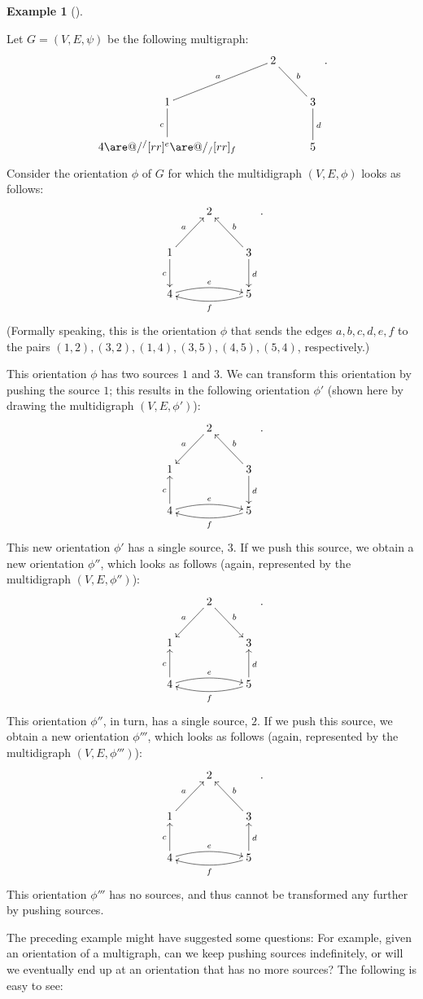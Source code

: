\documentclass[numbers=enddot,12pt,final,onecolumn,notitlepage]{scrartcl}%
\makeatletter
\theoremstyle{definition}
\newtheorem{exam}[theo]{Example}
\newenvironment{example}[1][]
{\begin{exam}[#1]\begin{leftbar}}
{\end{leftbar}\end{exam}}
\newcommand{\tup}[1]{\left( #1 \right)}
\newcommand{\are}{\ar@{-}}
\makeatother
\begin{document}
\Needspace{25cm}
\begin{example}
Let $G = \tup{V, E, \psi}$ be the following multigraph:
\[
\xymatrix{
& 2 \are[dl]_a \are[dr]^b \\
1 \are[d]_c & & 3 \are[d]^d \\
4 \are@/^/[rr]^e \are@/_/[rr]_f & & 5
} .
\]
Consider the orientation $\phi$ of $G$ for which the
multidigraph $\tup{V, E, \phi}$ looks as follows:
\[
\xymatrix{
& 2 \ar@{<-}[dl]_a \ar@{<-}[dr]^b \\
1 \ar[d]_c & & 3 \ar[d]^d \\
4 \ar@/^/[rr]^e \ar@{<-}@/_/[rr]_f & & 5
} .
\]
(Formally speaking, this is the orientation $\phi$ that
sends the edges $a, b, c, d, e, f$ to the pairs
$\tup{1, 2}, \tup{3, 2}, \tup{1, 4}, \tup{3, 5}, \tup{4, 5},
\tup{5, 4}$, respectively.)

This orientation $\phi$ has two sources $1$ and $3$.
We can transform this orientation by pushing the source
$1$; this results in the following orientation $\phi'$
(shown here by drawing the multidigraph $\tup{V, E, \phi'}$):
\[
\xymatrix{
& 2 \ar[dl]_a \ar@{<-}[dr]^b \\
1 \ar@{<-}[d]_c & & 3 \ar[d]^d \\
4 \ar@/^/[rr]^e \ar@{<-}@/_/[rr]_f & & 5
} .
\]
This new orientation $\phi'$ has a single source, $3$.
If we push this source, we obtain a new orientation
$\phi''$, which looks as follows (again, represented
by the multidigraph $\tup{V, E, \phi''}$):
\[
\xymatrix{
& 2 \ar[dl]_a \ar[dr]^b \\
1 \ar@{<-}[d]_c & & 3 \ar@{<-}[d]^d \\
4 \ar@/^/[rr]^e \ar@{<-}@/_/[rr]_f & & 5
} .
\]
This orientation $\phi''$, in turn, has a single source, $2$.
If we push this source, we obtain a new orientation
$\phi'''$, which looks as follows (again, represented
by the multidigraph $\tup{V, E, \phi'''}$):
\[
\xymatrix{
& 2 \ar@{<-}[dl]_a \ar@{<-}[dr]^b \\
1 \ar@{<-}[d]_c & & 3 \ar@{<-}[d]^d \\
4 \ar@/^/[rr]^e \ar@{<-}@/_/[rr]_f & & 5
} .
\]
This orientation $\phi'''$ has no sources, and thus cannot
be transformed any further by pushing sources.
\end{example}

The preceding example might have suggested some questions:
For example, given an orientation of a multigraph, can we
keep pushing sources indefinitely, or will we eventually
end up at an orientation that has no more sources?
The following is easy to see:
\end{document}
